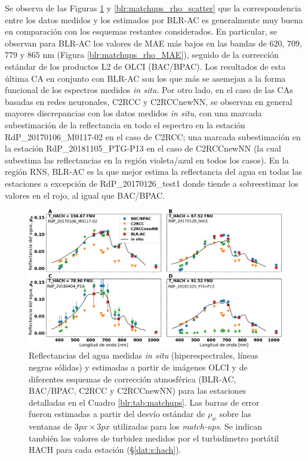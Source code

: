             Se observa de las Figuras \ref{blr:matchups_rho_hyper} y \ref{blr:matchups_rho_scatter} que la correspondencia entre los datos medidos y los estimados por BLR-AC es generalmente muy buena en comparación con los esquemas restantes considerados. En particular, se observan para BLR-AC los valores de MAE más bajos en las bandas de $620$, $709$, $779$ y $865$ nm (Figura \ref{blr:matchups_rho_MAE}), seguido de la corrección estándar de los productos L2 de OLCI (BAC/BPAC). Los resultados de esta última CA en conjunto con BLR-AC son los que más se asemejan a la forma funcional de los espectros medidos \textit{in situ}. Por otro lado, en el caso de las CAs basadas en redes neuronales, C2RCC y C2RCCnewNN, se observan en general mayores discrepancias con los datos medidos \textit{in situ}, con una marcada subestimación de la reflectancia en todo el espectro en la estación RdP\_20170106\_M0117-02 en el caso de C2RCC; una marcada subestimación en la estación RdP\_20181105\_PTG-P13 en el caso de C2RCCnewNN (la cual subestima las reflectancias en la región violeta/azul en todos los casos). En la región RNS, BLR-AC es la que mejor estima la reflectancia del agua en todas las estaciones a excepción de RdP\_20170126\_test1 donde tiende a sobreestimar los valores en el rojo, al igual que BAC/BPAC.
    
            \begin{figure}
            \centering
            \includegraphics[width=\textwidth]{blr/figures/matchups_rho_hyper.png}
            \caption[Reflectancias del agua medidas \textit{in situ} y estimadas a partir de imágenes OLCI y de diferentes esquemas de corrección atmosférica (BLR-AC, BAC/BPAC, C2RCC y C2RCCnewNN) para las estaciones detalladas en el Cuadro \ref{blr:tab:matchups}]{Reflectancias del agua medidas \textit{in situ} (hiperespectrales, líneas negras sólidas) y estimadas a partir de imágenes OLCI y de diferentes esquemas de corrección atmosférica (BLR-AC, BAC/BPAC, C2RCC y C2RCCnewNN) para las estaciones detalladas en el Cuadro \ref{blr:tab:matchups}. Las barras de error fueron estimadas a partir del desvío estándar de $\rho_{w}$ sobre las ventanas de $3 px \times3 px$ utilizadas para los \textit{match-ups}. Se indican también los valores de turbidez medidos por el turbidímetro portátil HACH para cada estación (\S \ref{dat:s:hach}).}
            \label{blr:matchups_rho_hyper}
            \end{figure}
            
